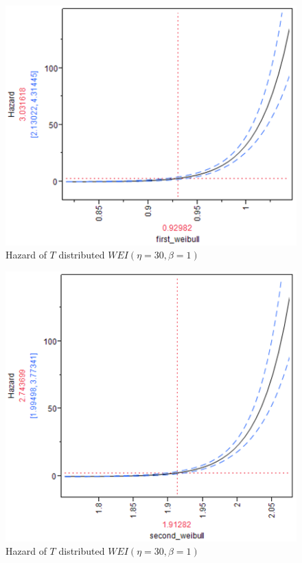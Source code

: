 \documentclass{article}
\begin{document}
\begin{enumerate}
\begin{enumerate}
  \begin{center}
        \FloatBarrier
      \begin{figure}
        \centering
        \includegraphics[width = 5in]{prob4d_weibull_1_haz.png}
        \caption{Hazard of \(T \) distributed \( WEI(\eta = 30 , \beta = 1)\)}
      \end{figure}
      \FloatBarrier
  \end{center}
  
   \begin{center}
        \FloatBarrier
      \begin{figure}
        \centering
        \includegraphics[width = 5in]{prob4d_weibull_2_haz.png}
        \caption{Hazard of \(T \) distributed \( WEI(\eta = 30 , \beta = 1)\)}
      \end{figure}
      \FloatBarrier
  \end{center}
  

\end{enumerate}
\end{enumerate}
\end{document}

